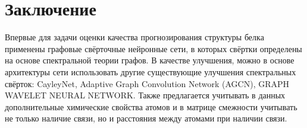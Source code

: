 \documentclass[14pt]{extarticle}
\begin{document}
\section{Заключение}
Впервые для задачи оценки качества прогнозирования структуры белка применены графовые свёрточные нейронные сети, в которых свёртки определены на основе спектральной теории графов. В качестве улучшения, можно в основе архитектуры сети использовать другие существующие улучшения спектральных свёрток: CayleyNet, Adaptive Graph Convolution Network (AGCN), GRAPH WAVELET NEURAL NETWORK. Также предлагается учитывать в данных дополнительные химические свойства атомов и в матрице смежности учитывать не только наличие связи, но и расстояния между атомами при наличии связи.

\newpage




\newpage
{}


\nocite{*}
\end{document}
